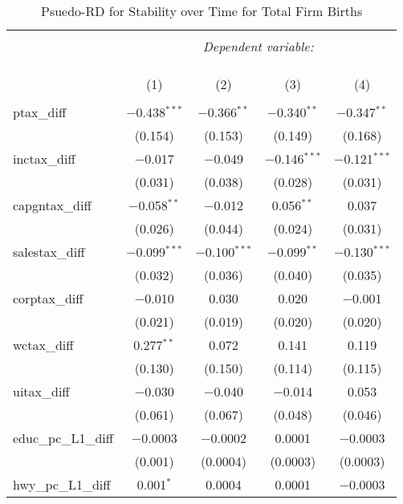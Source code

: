 
\begin{table}[!htbp] \centering 
  \caption{Psuedo-RD for Stability over Time for  Total Firm Births} 
  \label{} 
\begin{tabular}{@{\extracolsep{5pt}}lcccc} 
\\[-1.8ex]\hline 
\hline \\[-1.8ex] 
 & \multicolumn{4}{c}{\textit{Dependent variable:}} \\ 
\cline{2-5} 
\\[-1.8ex] & \multicolumn{4}{c}{ } \\ 
\\[-1.8ex] & (1) & (2) & (3) & (4)\\ 
\hline \\[-1.8ex] 
 ptax\_diff & $-$0.438$^{***}$ & $-$0.366$^{**}$ & $-$0.340$^{**}$ & $-$0.347$^{**}$ \\ 
  & (0.154) & (0.153) & (0.149) & (0.168) \\ 
  inctax\_diff & $-$0.017 & $-$0.049 & $-$0.146$^{***}$ & $-$0.121$^{***}$ \\ 
  & (0.031) & (0.038) & (0.028) & (0.031) \\ 
  capgntax\_diff & $-$0.058$^{**}$ & $-$0.012 & 0.056$^{**}$ & 0.037 \\ 
  & (0.026) & (0.044) & (0.024) & (0.031) \\ 
  salestax\_diff & $-$0.099$^{***}$ & $-$0.100$^{***}$ & $-$0.099$^{**}$ & $-$0.130$^{***}$ \\ 
  & (0.032) & (0.036) & (0.040) & (0.035) \\ 
  corptax\_diff & $-$0.010 & 0.030 & 0.020 & $-$0.001 \\ 
  & (0.021) & (0.019) & (0.020) & (0.020) \\ 
  wctax\_diff & 0.277$^{**}$ & 0.072 & 0.141 & 0.119 \\ 
  & (0.130) & (0.150) & (0.114) & (0.115) \\ 
  uitax\_diff & $-$0.030 & $-$0.040 & $-$0.014 & 0.053 \\ 
  & (0.061) & (0.067) & (0.048) & (0.046) \\ 
  educ\_pc\_L1\_diff & $-$0.0003 & $-$0.0002 & 0.0001 & $-$0.0003 \\ 
  & (0.001) & (0.0004) & (0.0003) & (0.0003) \\ 
  hwy\_pc\_L1\_diff & 0.001$^{*}$ & 0.0004 & 0.0001 & $-$0.0003 \\ 

\end{tabular}
\end{table}

